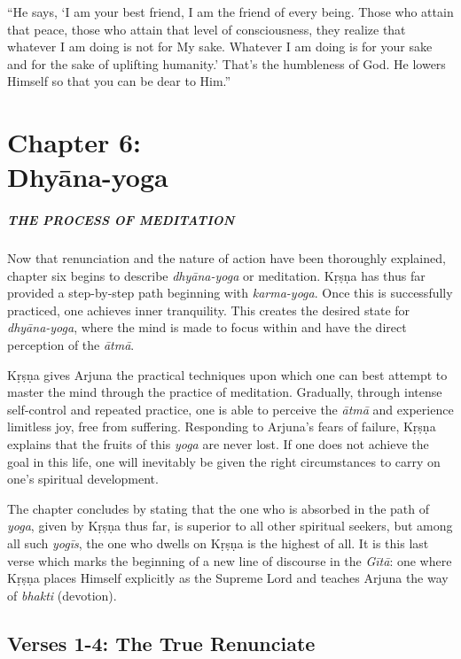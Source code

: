 \documentclass[12pt, twoside, openright]{memoir}
\begin{document}
\enquote{He says, \enquote{I am your best friend, I am the friend of every being. Those who attain that peace, those who attain that level of consciousness, they realize that whatever I am doing is not for My sake. Whatever I am doing is for your sake and for the sake of uplifting humanity.} That’s the humbleness of God. He lowers Himself so that you can be dear to Him.}
 \chapter{Chapter 6: \\Dhyāna-yoga}\label{chap-dhyana-yoga}

\paragraph*{\MakeUppercase{The Process of Meditation}}


\noindent Now that renunciation and the nature of action have been thoroughly explained, chapter six begins to describe \textit{dhyāna-yoga} or meditation. Kṛṣṇa has thus far provided a step-by-step path beginning with \textit{karma-yoga}. Once this is successfully practiced, one achieves inner tranquility. This creates the desired state for \textit{dhyāna-yoga}, where the mind is made to focus within and have the direct perception of the \textit{ātmā}.

Kṛṣṇa gives Arjuna the practical techniques upon which one can best attempt to master the mind through the practice of meditation. Gradually, through intense self-control and repeated practice, one is able to perceive the \textit{ātmā} and experience limitless joy, free from suffering. Responding to Arjuna’s fears of failure, Kṛṣṇa explains that the fruits of this \textit{yoga} are never lost. If one does not achieve the goal in this life, one will inevitably be given the right circumstances to carry on one’s spiritual development.

The chapter concludes by stating that the one who is absorbed in the path of \textit{yoga}, given by Kṛṣṇa thus far, is superior to all other spiritual seekers, but among all such \textit{yogīs}, the one who dwells on Kṛṣṇa is the highest of all. It is this last verse which marks the beginning of a new line of discourse in the \textit{Gītā}: one where Kṛṣṇa places Himself explicitly as the Supreme Lord and teaches Arjuna the way of \textit{bhakti} (devotion).

\section{Verses 1-4: The True Renunciate}\label{sec-verses-1-4-the-true-renunciate}
\end{document}

